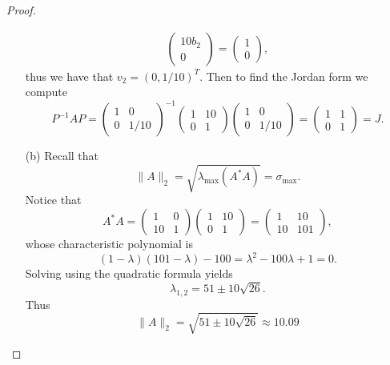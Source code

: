 \documentclass[12pt]{report}
\begin{document}
\begin{problem}
\begin{proof}
\begin{enumerate}
\begin{align*}
\begin{pmatrix}
            10 b_2 \\ 0
        \end{pmatrix} = \begin{pmatrix}
            1 \\ 0
        \end{pmatrix},
    \end{align*}
    thus we have that $v_2 = (0, 1/10)^T$. Then to find the Jordan form we compute
    \[
        P^{-1}AP = \begin{pmatrix}
            1 & 0 \\ 0 & 1/10
        \end{pmatrix}^{-1}\begin{pmatrix}
            1 & 10\\ 0 & 1
        \end{pmatrix}\begin{pmatrix}
            1 & 0 \\ 0 & 1/10
        \end{pmatrix} = \begin{pmatrix}
            1 & 1\\ 0 & 1
        \end{pmatrix} = J.
    \]

    \item [(b)]
    Recall that
    \[
        \|A\|_2 = \sqrt{\lambda_\text{max}(A^*A)} = \sigma_\text{max}.
    \]
    Notice that
    \[
        A^* A = \begin{pmatrix}
            1 & 0\\
            10 & 1 
        \end{pmatrix}\begin{pmatrix}
            1 & 10\\
            0 & 1
        \end{pmatrix} = \begin{pmatrix}
            1 & 10\\
            10 & 101
        \end{pmatrix},
    \]
    whose characteristic polynomial is
    \[
        (1 - \lambda)(101 - \lambda) - 100 = \lambda^2 -100\lambda + 1 = 0.
    \]
    Solving using the quadratic formula yields
    \[
        \lambda_{1,2} = 51 \pm 10\sqrt{26}.
    \]
    Thus 
    \[
        \|A\|_2 = \sqrt{51 \pm 10\sqrt{26}} \approx 10.09
    \]

\end{enumerate}

\end{proof}
\end{problem}
\end{document}
